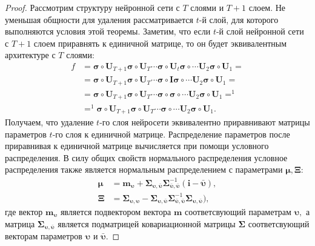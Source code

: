 \begin{proof}
Рассмотрим структуру нейронной сети с $T$ слоями и $T+1$ слоем. Не уменьшая общности для удаления рассматривается $t$-й слой, для которого выполняются условия этой теоремы. Заметим, что если $t$-й слой нейронной сети с $T+1$ слоем приравнять к единичной матрице, то он будет эквивалентным архитектуре с $T$ слоями:
\[
\label{eq:ap:tr:2:1}
\begin{aligned}
f &= \bm{\sigma} \circ \mathbf{U}_{T+1}\bm{\sigma} \circ \mathbf{U}_T \cdots \bm{\sigma} \circ \mathbf{U}_t\bm{\sigma} \circ \cdots  \mathbf{U}_2\bm{\sigma} \circ \mathbf{U}_1 =\\
&=  \bm{\sigma} \circ \mathbf{U}_{T+1}\bm{\sigma} \circ \mathbf{U}_T \cdots \bm{\sigma} \circ \mathbf{I}\bm{\sigma} \circ \cdots  \mathbf{U}_2\bm{\sigma} \circ \mathbf{U}_1 =\\
&=  \bm{\sigma} \circ \mathbf{U}_{T+1}\bm{\sigma} \circ \mathbf{U}_T \cdots \bm{\sigma} \circ \bm{\sigma} \circ \cdots  \mathbf{U}_2\bm{\sigma} \circ \mathbf{U}_1 =^{1}\\
&=^{1}  \bm{\sigma} \circ \mathbf{U}_{T+1}\bm{\sigma} \circ \mathbf{U}_T \cdots \bm{\sigma} \circ \cdots  \mathbf{U}_2\bm{\sigma} \circ \mathbf{U}_1.
\end{aligned}
\]
Получаем, что удаление $t$-го слоя нейросети эквивалентно приравнивают матрицы параметров $t$-го слоя к единичной матрице. Распределение параметров после приравнивая к единичной матрице вычисляется при помощи условного распределения. В силу общих свойств нормального распределения условное распределения также является нормальным распределением с параметрами $\bm{\mu}, \bm{\Xi}:$
\[
\label{eq:ap:tr:2:2}
\begin{aligned}
\bm{\mu} &= \mathbf{m}_{\bm{\upsilon}}+\bm{\Sigma}_{\bm{\upsilon},\bar{\bm{\upsilon}}} \bm{\Sigma}_{\bar{\bm{\upsilon}},\bar{\bm{\upsilon}}}^{-1} \left(\mathbf{i} - \bar{\bm{\upsilon}}\right), \\
\bm{\Xi} &= \bm{\Sigma}_{\bm{\upsilon},\bm{\upsilon}} - \bm{\Sigma}_{\bm{\upsilon},\bar{\bm{\upsilon}}}\bm{\Sigma}_{\bar{\bm{\upsilon}},\bar{\bm{\upsilon}}}^{-1}\bm{\Sigma}_{\bm{\upsilon},\bar{\bm{\upsilon}}}\bigr),
\end{aligned}
\]
где вектор $\mathbf{m}_{\bm{\upsilon}}$ является подвектором вектора $\mathbf{m}$ соответсвующий параметрам $\bm{\upsilon},$ а матрица $\bm{\Sigma}_{\bm{\upsilon},\bar{\bm{\upsilon}}}$ является подматрицей ковариационной матрицы $\bm{\Sigma}$ соответсвующий векторам параметров $\bm{\upsilon}$ и $\bar{\bm{\upsilon}}.$
\end{proof}

